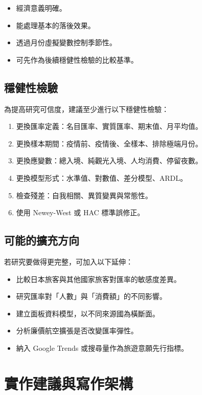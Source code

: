 \documentclass[12pt,a4paper,fontset=none]{ctexart}
\begin{document}
\begin{itemize}
  \item 經濟意義明確。
  \item 能處理基本的落後效果。
  \item 透過月份虛擬變數控制季節性。
  \item 可先作為後續穩健性檢驗的比較基準。
\end{itemize}

\subsection{穩健性檢驗}

為提高研究可信度，建議至少進行以下穩健性檢驗：

\begin{enumerate}
  \item 更換匯率定義：名目匯率、實質匯率、期末值、月平均值。
  \item 更換樣本期間：疫情前、疫情後、全樣本、排除極端月份。
  \item 更換應變數：總入境、純觀光入境、人均消費、停留夜數。
  \item 更換模型形式：水準值、對數值、差分模型、ARDL。
  \item 檢查殘差：自我相關、異質變異與常態性。
  \item 使用 Newey-West 或 HAC 標準誤修正。
\end{enumerate}

\subsection{可能的擴充方向}

若研究要做得更完整，可加入以下延伸：

\begin{itemize}
  \item 比較日本旅客與其他國家旅客對匯率的敏感度差異。
  \item 研究匯率對「人數」與「消費額」的不同影響。
  \item 建立面板資料模型，以不同來源國為橫斷面。
  \item 分析廉價航空擴張是否改變匯率彈性。
  \item 納入 Google Trends 或搜尋量作為旅遊意願先行指標。
\end{itemize}

\section{實作建議與寫作架構}
\end{document}
